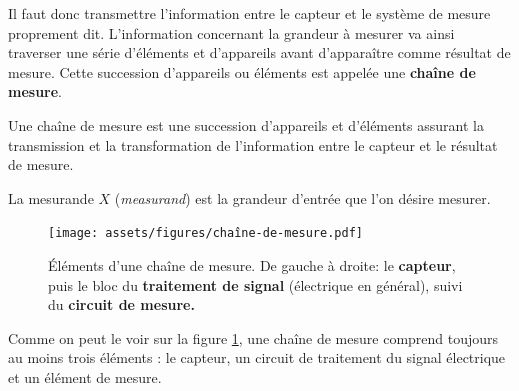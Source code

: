 Il faut donc transmettre l'information entre le capteur et le système de mesure proprement dit. L'information concernant la grandeur à mesurer va ainsi traverser une série d'éléments et d'appareils avant d'apparaître comme résultat de mesure. Cette succession d'appareils ou éléments est appelée une \textbf{chaîne de mesure}.

\begin{definition}
    Une chaîne de mesure est une succession d'appareils et d'éléments assurant la transmission et la transformation de l'information entre le capteur et le résultat de mesure.
\end{definition}

\begin{definition}
    La mesurande $X$ (\emph{measurand}) est la grandeur d'entrée que l'on désire mesurer.
\end{definition}

\begin{figure}[ht]
   \centering
   \vspace{-5mm}
   \texttt{[image: assets/figures/chaîne-de-mesure.pdf]}
   \caption{Éléments d'une chaîne de mesure. De gauche à droite: le \textbf{capteur}, puis le bloc du \textbf{traitement de signal} (électrique en général), suivi du \textbf{circuit de mesure.}}
   \label{fig:chaine_de_mesure}
\end{figure}
Comme on peut le voir sur la figure \ref{fig:chaine_de_mesure}, une chaîne de mesure comprend toujours au moins trois éléments : le capteur, un circuit de traitement du signal électrique et un élément de mesure.

